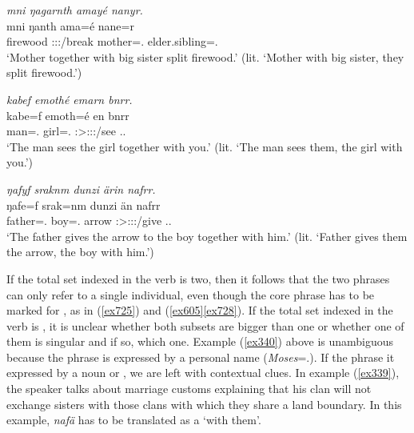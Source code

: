 \begin{exe}
	\ex \emph{mni ŋagarnth amayé nanyr.}\\
	\gll mni ŋanth ama=é nane=r\\
	firewood \Stdu:\Sbj:\Nonpast:\Ipfv/break mother=\Erg.{\Nsg} {elder.sibling}=\Assoc.\Du\\
	\trans `Mother together with big sister split firewood.' (lit. `Mother with big sister, they split firewood.')
	\label{ex605}
\end{exe}
\begin{exe}
	\ex \emph{kabef emothé emarn bnrr.}\\
	\gll kabe=f emoth=é en bnrr\\
	man=\Erg.{\Sg} girl=\Abs.{\Nsg} \Stsg:\Sbj>\Stdu:\Obj:\Nonpast:\Ipfv/see \Second.\Du.\Assoc\\
	\trans `The man sees the girl together with you.' (lit. `The man sees them, the girl with you.')
	\label{ex727}
\end{exe}
\begin{exe}
	\ex \emph{ŋafyf sraknm dunzi ärin nafrr.}\\
	\gll ŋafe=f srak=nm dunzi än nafrr\\
	father=\Erg.{\Sg} boy=\Dat.{\Nsg} arrow \Stsg:\Sbj>\Stdu:\Io:\Nonpast:\Ipfv/give \Third.\Du.\Assoc\\
	\trans `The father gives the arrow to the boy together with him.' (lit. `Father gives them the arrow, the boy with him.')
	\label{ex728}
\end{exe}

If the total set indexed in the verb is two, then it follows that the two phrases can only refer to a single individual, even though the core phrase has to be marked for , as in (\ref{ex725}) and (\ref{ex605}\textendash\ref{ex728}). If the total set indexed in the verb is , it is unclear whether both subsets are bigger than one or whether one of them is singular and if so, which one. Example (\ref{ex340}) above is unambiguous because the  phrase is expressed by a personal name (\emph{Moses}=\Assoc.\Pl). If the  phrase it expressed by a noun or , we are left with contextual clues. In example (\ref{ex339}), the speaker talks about marriage customs explaining that his clan will not exchange sisters with those clans with which they share a land boundary. In this example, \emph{nafä} has to be translated as a  `with them'.

